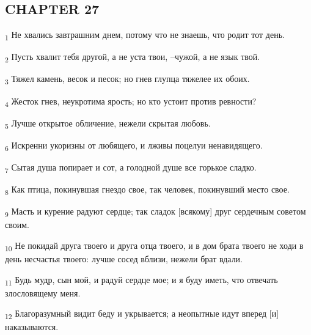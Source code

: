 \subsection{CHAPTER 27}
\begin{tcolorbox}
\textsubscript{1} Не хвались завтрашним днем, потому что не знаешь, что родит тот день.
\end{tcolorbox}
\begin{tcolorbox}
\textsubscript{2} Пусть хвалит тебя другой, а не уста твои, --чужой, а не язык твой.
\end{tcolorbox}
\begin{tcolorbox}
\textsubscript{3} Тяжел камень, весок и песок; но гнев глупца тяжелее их обоих.
\end{tcolorbox}
\begin{tcolorbox}
\textsubscript{4} Жесток гнев, неукротима ярость; но кто устоит против ревности?
\end{tcolorbox}
\begin{tcolorbox}
\textsubscript{5} Лучше открытое обличение, нежели скрытая любовь.
\end{tcolorbox}
\begin{tcolorbox}
\textsubscript{6} Искренни укоризны от любящего, и лживы поцелуи ненавидящего.
\end{tcolorbox}
\begin{tcolorbox}
\textsubscript{7} Сытая душа попирает и сот, а голодной душе все горькое сладко.
\end{tcolorbox}
\begin{tcolorbox}
\textsubscript{8} Как птица, покинувшая гнездо свое, так человек, покинувший место свое.
\end{tcolorbox}
\begin{tcolorbox}
\textsubscript{9} Масть и курение радуют сердце; так сладок [всякому] друг сердечным советом своим.
\end{tcolorbox}
\begin{tcolorbox}
\textsubscript{10} Не покидай друга твоего и друга отца твоего, и в дом брата твоего не ходи в день несчастья твоего: лучше сосед вблизи, нежели брат вдали.
\end{tcolorbox}
\begin{tcolorbox}
\textsubscript{11} Будь мудр, сын мой, и радуй сердце мое; и я буду иметь, что отвечать злословящему меня.
\end{tcolorbox}
\begin{tcolorbox}
\textsubscript{12} Благоразумный видит беду и укрывается; а неопытные идут вперед [и] наказываются.
\end{tcolorbox}
